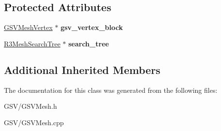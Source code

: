 \subsection*{Protected Attributes}
\begin{DoxyCompactItemize}
\item 
\hyperlink{class_g_s_v_mesh_vertex}{G\+S\+V\+Mesh\+Vertex} $\ast$ {\bfseries gsv\+\_\+vertex\+\_\+block}\hypertarget{class_g_s_v_mesh_a496ee13f368242f1575827285fc615a0}{}\label{class_g_s_v_mesh_a496ee13f368242f1575827285fc615a0}

\item 
\hyperlink{class_r3_mesh_search_tree}{R3\+Mesh\+Search\+Tree} $\ast$ {\bfseries search\+\_\+tree}\hypertarget{class_g_s_v_mesh_a12a8557cf89e4277909c9441bb43970f}{}\label{class_g_s_v_mesh_a12a8557cf89e4277909c9441bb43970f}

\end{DoxyCompactItemize}
\subsection*{Additional Inherited Members}


The documentation for this class was generated from the following files\+:\begin{DoxyCompactItemize}
\item 
G\+S\+V/G\+S\+V\+Mesh.\+h\item 
G\+S\+V/G\+S\+V\+Mesh.\+cpp\end{DoxyCompactItemize}
